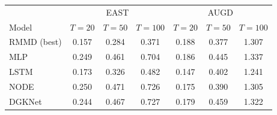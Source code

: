 \begin{tabular}{lcccccc}
\toprule
 & \multicolumn{3}{c}{EAST} & \multicolumn{3}{c}{AUGD} \\
Model & $T{=}20$ & $T{=}50$ & $T{=}100$ & $T{=}20$ & $T{=}50$ & $T{=}100$ \\
\midrule
RMMD (best) & 0.157 & 0.284 & 0.371 & 0.188 & 0.377 & 1.307 \\
MLP & 0.249 & 0.461 & 0.704 & 0.186 & 0.445 & 1.337 \\
LSTM & 0.173 & 0.326 & 0.482 & 0.147 & 0.402 & 1.241 \\
NODE & 0.250 & 0.471 & 0.726 & 0.175 & 0.390 & 1.305 \\
DGKNet & 0.244 & 0.467 & 0.727 & 0.179 & 0.459 & 1.322 \\
\bottomrule
\end{tabular}